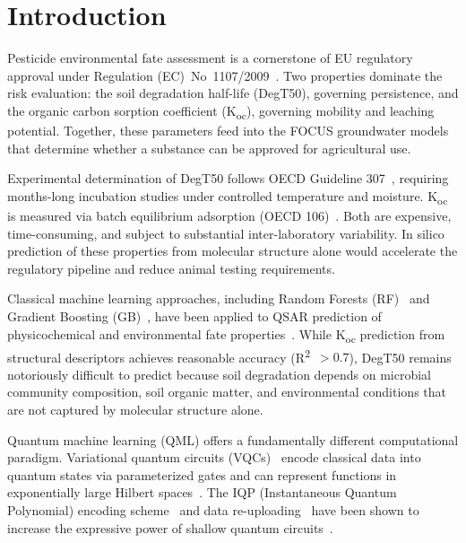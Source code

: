 \documentclass[twoside,twocolumn,9pt]{article}
\newcommand{\degtl}{DegT50}
\newcommand{\koc}{K\textsubscript{oc}}
\newcommand{\rtwo}{R\textsuperscript{2}}
\begin{document}









\section{Introduction}
\label{sec:intro}

Pesticide environmental fate assessment is a cornerstone of EU regulatory
approval under Regulation (EC)~No~1107/2009~\cite{ec1107_2009}. Two
properties dominate the risk evaluation: the soil degradation half-life
(\degtl{}), governing persistence, and the organic carbon sorption
coefficient (\koc{}), governing mobility and leaching potential. Together,
these parameters feed into the FOCUS groundwater models~\cite{focus2006}
that determine whether a substance can be approved for agricultural use.

Experimental determination of \degtl{} follows OECD Guideline
307~\cite{oecd307}, requiring months-long incubation studies under
controlled temperature and moisture. \koc{} is measured via batch
equilibrium adsorption (OECD 106)~\cite{oecd106}. Both are expensive,
time-consuming, and subject to substantial inter-laboratory variability.
In silico prediction of these properties from molecular structure alone
would accelerate the regulatory pipeline and reduce animal testing
requirements.

Classical machine learning approaches, including Random Forests
(RF)~\cite{breiman2001} and Gradient Boosting (GB)~\cite{friedman2001},
have been applied to QSAR prediction of physicochemical and environmental
fate properties~\cite{mansouri2018}. While \koc{} prediction from
structural descriptors achieves reasonable accuracy (\rtwo{}~$> 0.7$),
\degtl{} remains notoriously difficult to predict because soil degradation
depends on microbial community composition, soil organic matter, and
environmental conditions that are not captured by molecular structure alone.

Quantum machine learning (QML) offers a fundamentally different
computational paradigm. Variational quantum circuits
(VQCs)~\cite{cerezo2021} encode classical data into quantum states via
parameterized gates and can represent functions in exponentially large
Hilbert spaces~\cite{havlicek2019}. The IQP (Instantaneous Quantum
Polynomial) encoding scheme~\cite{schuld2019iqp} and data
re-uploading~\cite{perezslava2020} have been shown to increase the
expressive power of shallow quantum circuits~\cite{schuld2020}.
\end{document}
